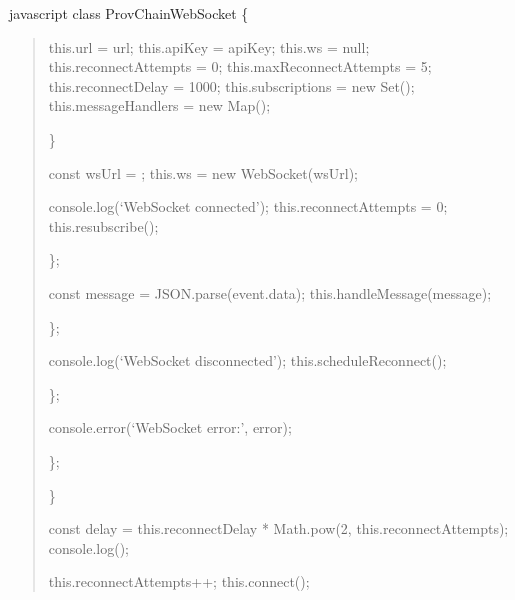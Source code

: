 \documentclass[letterpaper,10pt,english]{sphinxmanual}
\begin{document}
\sphinxAtStartPar
{\color{red}\bfseries{}\textasciigrave{}\textasciigrave{}}{\color{red}\bfseries{}\textasciigrave{}}javascript
class ProvChainWebSocket \{
\begin{quote}
\begin{description}
\sphinxAtStartPar
this.url = url;
this.apiKey = apiKey;
this.ws = null;
this.reconnectAttempts = 0;
this.maxReconnectAttempts = 5;
this.reconnectDelay = 1000;
this.subscriptions = new Set();
this.messageHandlers = new Map();

\end{description}

\sphinxAtStartPar
\}
\begin{description}
\sphinxAtStartPar
const wsUrl = ;
this.ws = new WebSocket(wsUrl);
\begin{description}
\sphinxAtStartPar
console.log(‘WebSocket connected’);
this.reconnectAttempts = 0;
this.resubscribe();

\end{description}

\sphinxAtStartPar
\};
\begin{description}
\sphinxAtStartPar
const message = JSON.parse(event.data);
this.handleMessage(message);

\end{description}

\sphinxAtStartPar
\};
\begin{description}
\sphinxAtStartPar
console.log(‘WebSocket disconnected’);
this.scheduleReconnect();

\end{description}

\sphinxAtStartPar
\};
\begin{description}
\sphinxAtStartPar
console.error(‘WebSocket error:’, error);

\end{description}

\sphinxAtStartPar
\};

\end{description}

\sphinxAtStartPar
\}
\begin{description}
\begin{description}
\sphinxAtStartPar
const delay = this.reconnectDelay * Math.pow(2, this.reconnectAttempts);
console.log();
\begin{description}
\sphinxAtStartPar
this.reconnectAttempts++;
this.connect();


\end{description}
\end{description}
\end{description}
\end{quote}
\end{document}
